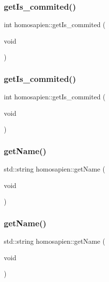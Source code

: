 \subsubsection{\texorpdfstring{get\+Is\+\_\+commited()}{getIs\_commited()}\hspace{0.1cm}{\footnotesize\ttfamily [1/2]}}
{\footnotesize\ttfamily int homosapien\+::get\+Is\+\_\+commited (\begin{DoxyParamCaption}\item[{void}]{ }\end{DoxyParamCaption})}

\mbox{\label{classhomosapien_a3264f22c6b40fd138286980a7bafd11e}} 
\subsubsection{\texorpdfstring{get\+Is\+\_\+commited()}{getIs\_commited()}\hspace{0.1cm}{\footnotesize\ttfamily [2/2]}}
{\footnotesize\ttfamily int homosapien\+::get\+Is\+\_\+commited (\begin{DoxyParamCaption}\item[{void}]{ }\end{DoxyParamCaption})}

\mbox{\label{classhomosapien_a1e93a89a2490a563289e7ad7a295ff45}} 
\subsubsection{\texorpdfstring{get\+Name()}{getName()}\hspace{0.1cm}{\footnotesize\ttfamily [1/2]}}
{\footnotesize\ttfamily std\+::string homosapien\+::get\+Name (\begin{DoxyParamCaption}\item[{void}]{ }\end{DoxyParamCaption})}

\mbox{\label{classhomosapien_a1e93a89a2490a563289e7ad7a295ff45}} 
\subsubsection{\texorpdfstring{get\+Name()}{getName()}\hspace{0.1cm}{\footnotesize\ttfamily [2/2]}}
{\footnotesize\ttfamily std\+::string homosapien\+::get\+Name (\begin{DoxyParamCaption}\item[{void}]{ }\end{DoxyParamCaption})}

